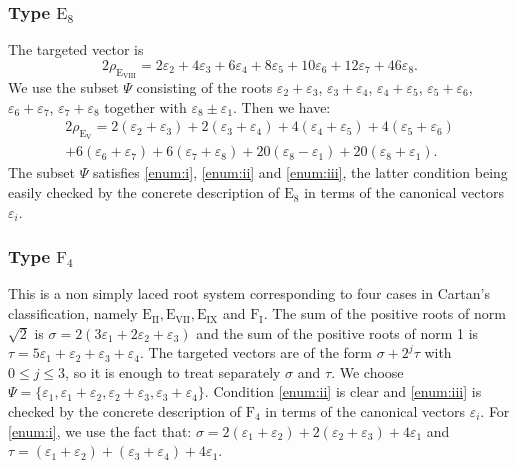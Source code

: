 \documentclass[JEP,XML,SOM,Unicode,published]{cedram}
\newcommand{\rI}{\mathrm{I}}
\theoremstyle{plain}
\theoremstyle{remark}
\theoremstyle{definition}
\begin{document}
\subsubsection*{Type $\mathrm{E}_8$
\cite[Planche VII, p.\,268]{BBK-Lie-4to6}}
The targeted vector is
\[
2 \rho_{\mathrm{E}_\mathrm{VIII}} = 2 \varepsilon_2 + 4 \varepsilon_3 + 6 \varepsilon_4 + 8 \varepsilon_5 + 10 \varepsilon_6 + 12 \varepsilon_7 + 46 \varepsilon_8.
\]
We use the subset $\Psi$ consisting of the roots $\varepsilon_2+\varepsilon_3$, $\varepsilon_3+\varepsilon_4$, $\varepsilon_4+\varepsilon_5$, $\varepsilon_5+\varepsilon_6$, $\varepsilon_6+\varepsilon_7$, $\varepsilon_7+\varepsilon_8$ together with
$\varepsilon_8 \pm \varepsilon_1$.
Then we have:
\begin{multline*}
2 \rho_{\mathrm{E}_\mathrm{V}}
= 2 (\varepsilon_2+\varepsilon_3) + 2 (\varepsilon_3+\varepsilon_4) + 4 (\varepsilon_4+\varepsilon_5) + 4 (\varepsilon_5+\varepsilon_6)\\
+ 6 (\varepsilon_6+\varepsilon_7) + 6 (\varepsilon_7+\varepsilon_8)
+ 20 (\varepsilon_8-\varepsilon_1) + 20 (\varepsilon_8+\varepsilon_1).
\end{multline*}
The subset $\Psi$ satisfies \eqref{enum:i}, \eqref{enum:ii} and \eqref{enum:iii}, the latter condition being easily checked by the concrete description of $\mathrm{E}_8$ in terms of the canonical vectors $\varepsilon_i$.

\subsubsection*{Type $\mathrm{F}_4$
\cite[Planche VIII, p.\,272]{BBK-Lie-4to6}}
This is a non simply laced root system corresponding to four cases in Cartan's classification, namely $\mathrm{E}_\mathrm{II}, \mathrm{E}_\mathrm{VII}, \mathrm{E}_\mathrm{IX}$ and $\mathrm{F}_\rI$.
The sum of the positive roots of norm $\sqrt{2}$ is $\sigma = 2 (3 \varepsilon_1 + 2 \varepsilon_2 + \varepsilon_3)$ and the sum of the positive roots of norm 1 is $\tau = 5 \varepsilon_1 + \varepsilon_2 + \varepsilon_3 + \varepsilon_4$.
The targeted vectors are of the form $\sigma + 2^j \tau$ with $0 \leqslant j \leqslant 3$, so it is enough to treat separately $\sigma$ and $\tau$.
We choose $\Psi = \{\varepsilon_1, \varepsilon_1+\varepsilon_2, \varepsilon_2+\varepsilon_3, \varepsilon_3+\varepsilon_4 \}$.
Condition \eqref{enum:ii} is clear and \eqref{enum:iii} is checked by the concrete description of $\mathrm{F}_4$ in terms of the canonical vectors $\varepsilon_i$.
For \eqref{enum:i}, we use the fact that: $\sigma = 2 (\varepsilon_1+\varepsilon_2) + 2 (\varepsilon_2+\varepsilon_3) + 4 \varepsilon_1$ and
$\tau = (\varepsilon_1+\varepsilon_2) + (\varepsilon_3+\varepsilon_4) + 4 \varepsilon_1$.
\end{document}
